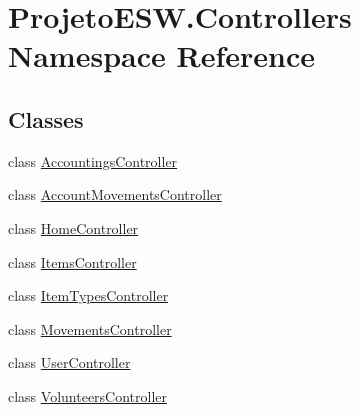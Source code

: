 \hypertarget{namespace_projeto_e_s_w_1_1_controllers}{}\section{Projeto\+E\+S\+W.\+Controllers Namespace Reference}
\label{namespace_projeto_e_s_w_1_1_controllers}
\subsection*{Classes}
\begin{DoxyCompactItemize}
\item 
class \mbox{\hyperlink{class_projeto_e_s_w_1_1_controllers_1_1_accountings_controller}{Accountings\+Controller}}
\item 
class \mbox{\hyperlink{class_projeto_e_s_w_1_1_controllers_1_1_account_movements_controller}{Account\+Movements\+Controller}}
\item 
class \mbox{\hyperlink{class_projeto_e_s_w_1_1_controllers_1_1_home_controller}{Home\+Controller}}
\item 
class \mbox{\hyperlink{class_projeto_e_s_w_1_1_controllers_1_1_items_controller}{Items\+Controller}}
\item 
class \mbox{\hyperlink{class_projeto_e_s_w_1_1_controllers_1_1_item_types_controller}{Item\+Types\+Controller}}
\item 
class \mbox{\hyperlink{class_projeto_e_s_w_1_1_controllers_1_1_movements_controller}{Movements\+Controller}}
\item 
class \mbox{\hyperlink{class_projeto_e_s_w_1_1_controllers_1_1_user_controller}{User\+Controller}}
\item 
class \mbox{\hyperlink{class_projeto_e_s_w_1_1_controllers_1_1_volunteers_controller}{Volunteers\+Controller}}
\end{DoxyCompactItemize}
